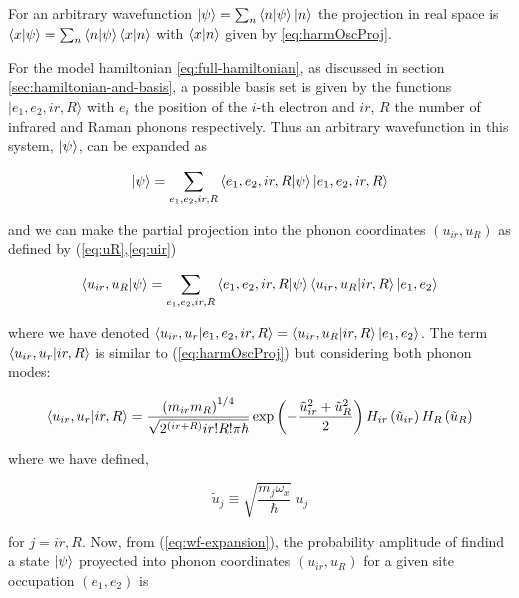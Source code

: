 For an arbitrary wavefunction $\left | \psi \right\rangle = \sum_n \left\langle n|\psi\right\rangle \left | n \right\rangle$ the projection in real space is $\left\langle x|\psi\right\rangle = \sum_n \left\langle n|\psi\right\rangle \left\langle x|n\right\rangle$ with $\left\langle x|n\right\rangle$ given by \ref{eq:harmOscProj}.

For the model hamiltonian \ref{eq:full-hamiltonian}, as discussed in section \ref{sec:hamiltonian-and-basis}, a possible basis set is given by the functions ${| e_1, e_2, ir, R \rangle}$ with $e_i$ the position of the $i$-th electron and $ir$, $R$ the number of infrared and Raman phonons respectively. 
Thus an arbitrary wavefunction in this system, $\left | \psi \right\rangle$, can be expanded as

\begin{equation}\label{eq:wf-phonon-base}
\left | \psi \right\rangle=\sum_{e_1,e_2,ir,R} \left\langle e_1,e_2,ir,R|\psi\right\rangle\left | e_1,e_2,ir,R \right\rangle
\end{equation}

\noindent and we can make the partial projection into the phonon coordinates $(u_{ir},u_R)$ as defined by (\ref{eq:uR},\ref{eq:uir})

\begin{equation}\label{eq:wf-expansion}
\left\langle u_{ir},u_R|\psi\right\rangle=\sum_{e_1,e_2,ir,R} \left\langle e_1,e_2,ir,R|\psi\right\rangle\left\langle u_{ir},u_R|ir,R\right\rangle\left | e_1,e_2 \right\rangle
\end{equation}

\noindent where we have denoted $\left\langle u_{ir},u_r|e_1,e_2,ir,R\right\rangle=\left\langle u_{ir},u_R|ir,R\right\rangle\left | e_1,e_2 \right\rangle$. 
The term $\left\langle u_{ir},u_r|ir,R\right\rangle$ is similar to (\ref{eq:harmOscProj}) but considering both phonon modes:

\begin{equation}\label{eq:hermite-expansion}
\left\langle u_{ir},u_r|ir,R\right\rangle  = \frac{\left(m_{ir}m_R\right)^{1/4}}{\sqrt{2^{(ir+R)} ir!R!\pi\hbar}}
\exp\left(-\frac{\tilde{u}_{ir}^2 + \tilde{u}_R^2}{2}\right) 
H_{ir}\left(\tilde{u}_{ir} \right)H_{R}\left(\tilde{u}_{R} \right)
\end{equation}

\noindent where we have defined,

\begin{equation}\label{eq:uTildeDef}
\tilde{u}_j \equiv \sqrt{\frac{m_j\omega_x}{\hbar}}\ u_j
\end{equation}

\noindent for $j=ir,R$. 
Now, from (\ref{eq:wf-expansion}), the probability amplitude of findind a state $\left | \psi \right\rangle$ proyected into phonon coordinates $(u_{ir},u_R)$ for a given site occupation $(e_1,e_2)$ is

